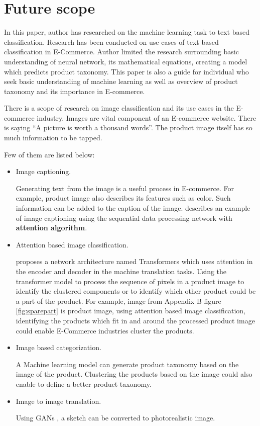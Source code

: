   \section{Future scope}

  In this paper, author has researched on the machine learning task to text based classification. Research has been conducted on use cases of text based classification in E-Commerce. Author limited the research surrounding basic understanding of neural network, its mathematical equations, creating a model which predicts product taxonomy.  This paper is also a guide for individual who seek basic understanding of machine learning as well as overview of product taxonomy and its importance in E-commerce.

  There is a scope of research on image classification and its use cases in the E-commerce industry. Images are vital component of an E-commerce website. There is saying ``A picture is worth a thousand words''. The product image itself has so much information  to be tapped. 

  Few of them are listed below:
  \begin{itemize}
    \item Image captioning.
    
    Generating text from the image is a useful process in E-commerce. For example, product image also describes its features such as color. Such information can be added to the caption of the image. \parencite[Section 15.4.7]{pml1Book} describes an example of image captioning using the sequential data processing network with \textbf{attention algorithm}.
    
    \item Attention based image classification.
    
    \parencite{Vaswani.12062017} proposes a network architecture named Transformers which uses attention in the encoder and decoder in the machine translation tasks. Using the transformer model to process the sequence of pixels in a product image to identify the clustered components or to identify which other product could be a part of the product.
    For example, image from Appendix B figure \ref{fig:sparepart} is product image, using attention based image classification, identifying the products which fit in and around the processed product image could enable E-Commerce industries cluster the products.
 


    \item Image based categorization.
    
    A Machine learning model can generate product taxonomy based on the image of the product. Clustering the products based on the image could also enable to define a better product taxonomy. 

    \item Image to image translation.
   
    Using \acfp{GAN} \parencite{Goodfellow.31122016}, a sketch can be converted to photorealistic image.     
    

  \end{itemize}